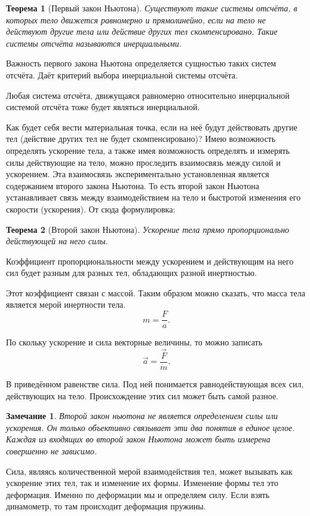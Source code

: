 \documentclass[10pt]{extbook}
\newtheorem{theorem}{Теорема}[section]
\newtheorem{corollary}{Замечание}[theorem]
\begin{document}
\begin{theorem}[Первый закон Ньютона]
	Существуют такие системы отсчёта, в которых тело движется равномерно и
	прямолинейно, если на тело не  действуют другие тела или действие других тел
	скомпенсировано. Такие системы отсчёта называются инерциальными.
\end{theorem}

Важность первого закона Ньютона определяется сущностью таких систем отсчёта.
Даёт критерий выбора инерциальной системы отсчёта.

Любая система отсчёта, движущаяся равномерно относительно инерциальной системой
отсчёта тоже будет являться инерциальной.

Как будет себя вести материальная точка, если на неё будут действовать другие
тел (действие других тел не будет скомпенсировано)? Имею возможность определять
ускорение тела, а также имея возможность определять и измерять силы действующие
на тело, можно проследить взаимосвязь между силой и ускорением. Эта взаимосвязь
экспериментально установленная является содержанием второго закона Ньютона. То
есть второй закон Ньютона устанавливает связь между взаимодействием на тело и
быстротой изменения его скорости (ускорения). От сюда формулировка:

\begin{theorem}[Второй закон Ньютона]
	Ускорение тела прямо пропорционально действующей на него силы.
\end{theorem}

Коэффициент пропорциональности между ускорением и действующим на него сил будет
разным для разных тел, обладающих разной инертностью.

Этот коэффициент связан с массой. Таким образом можно сказать, что масса тела
является мерой инертности тела. \[
	m = \frac{F}{a}
	.\]

По скольку ускорение и сила векторные величины, то можно записать \[
	\vec{a} = \frac{\vec{F}}{m}
	.\]

В приведённом равенстве сила. Под ней понимается равнодействующая всех сил,
действующих на тело. Происхождение этих сил может быть самой разное.

\begin{corollary}
	Второй закон ньютона не является определением силы или ускорения. Он только
	объективно связывает эти два понятия в единое целое. Каждая из входящих во
	второй закон Ньютона может быть измерена совершенно не зависимо.
\end{corollary}

Сила, являясь количественной мерой взаимодействия тел, может вызывать как
ускорение этих тел, так и изменение их формы. Изменение формы тел это деформация.
Именно по деформации мы и определяем силу. Если взять динамометр, то там
происходит деформация пружины.
\end{document}
